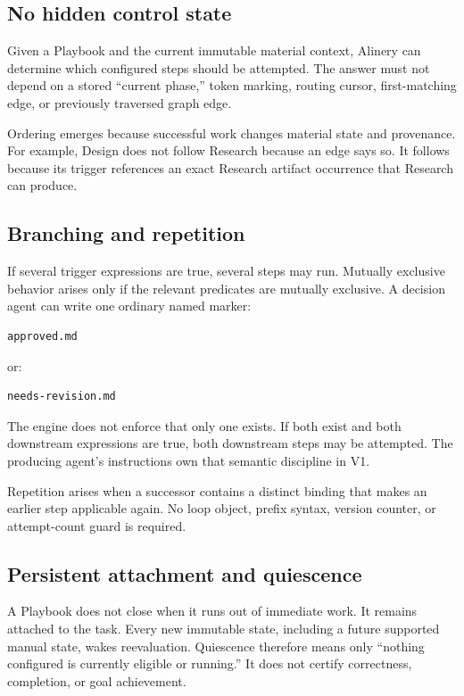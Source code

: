 \documentclass[11pt]{article}
\begin{document}
\subsection{No hidden control state}

Given a Playbook and the current immutable material context, Alinery can determine which configured steps should be attempted. The answer must not depend on a stored ``current phase,'' token marking, routing cursor, first-matching edge, or previously traversed graph edge.

Ordering emerges because successful work changes material state and provenance. For example, Design does not follow Research because an edge says so. It follows because its trigger references an exact Research artifact occurrence that Research can produce.

\subsection{Branching and repetition}

If several trigger expressions are true, several steps may run. Mutually exclusive behavior arises only if the relevant predicates are mutually exclusive. A decision agent can write one ordinary named marker:

\begin{lstlisting}[style=playbook]
approved.md
\end{lstlisting}

or:

\begin{lstlisting}[style=playbook]
needs-revision.md
\end{lstlisting}

The engine does not enforce that only one exists. If both exist and both downstream expressions are true, both downstream steps may be attempted. The producing agent's instructions own that semantic discipline in V1.

Repetition arises when a successor contains a distinct binding that makes an earlier step applicable again. No loop object, prefix syntax, version counter, or attempt-count guard is required.

\subsection{Persistent attachment and quiescence}

A Playbook does not close when it runs out of immediate work. It remains attached to the task. Every new immutable state, including a future supported manual state, wakes reevaluation. Quiescence therefore means only ``nothing configured is currently eligible or running.'' It does not certify correctness, completion, or goal achievement.
\end{document}
